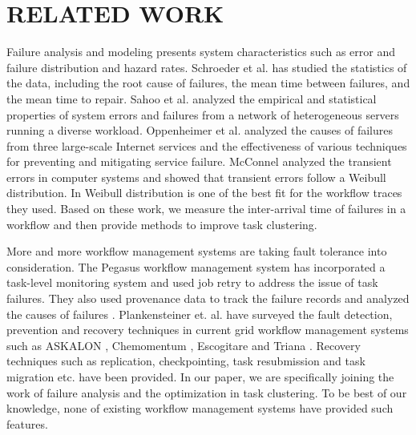 \documentclass{IOS-Book-Article}
\begin{document}
\section{RELATED WORK}
\label{sec:related}

Failure analysis and modeling \cite{Tang1990} presents system characteristics such as error and failure distribution and hazard rates. Schroeder et al. \cite{Schroeder2006} has studied the statistics of the data, including the root cause of failures, the mean time between failures, and the mean time to repair. Sahoo et al. \cite{Sahoo2004} analyzed the empirical and statistical properties of system errors and failures from a network of heterogeneous servers running a diverse workload. Oppenheimer et al. \cite{Oppenheimer2002} analyzed the causes of failures from three large-scale Internet services and the effectiveness of various techniques for preventing and mitigating service failure. McConnel \cite{McConnel} analyzed the transient errors in computer systems and showed that transient errors follow a Weibull distribution. In \cite{Sun2003, Iosup2008} Weibull distribution is one of the best fit for the workflow traces they used.  Based on these work, we measure the inter-arrival time of failures in a workflow and then provide methods to improve task clustering.  

More and more workflow management systems are taking fault tolerance into consideration. The Pegasus workflow management system \cite{Deelman2004} has incorporated a task-level monitoring system and used job retry to address the issue of task failures. They also used provenance data to track the failure records and analyzed the causes of failures \cite{Samak2011}. Plankensteiner et. al. \cite{plankensteiner2009fault} have surveyed the fault detection, prevention and recovery techniques in current grid workflow management systems such as ASKALON \cite{fahringer2007askalon}, Chemomentum \cite{schuller2008chemomentum}, Escogitare \cite{laforenza2007biological} and Triana \cite{taylor2007triana}. Recovery techniques such as replication, checkpointing, task resubmission  and task migration etc. have been provided. In our paper, we are specifically joining the work of failure analysis and the optimization in task clustering. To be best of our knowledge, none of existing workflow management systems have provided such features. 
\end{document}
